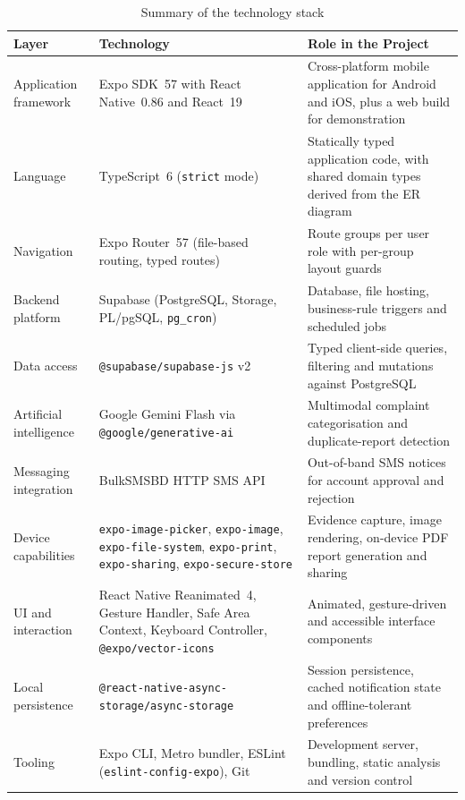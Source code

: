 \documentclass[11pt,a4paper]{article}
\newcommand{\code}[1]{\texttt{\small #1}}
\begin{document}
\begin{table}[!htbp]
\centering
\caption{Summary of the technology stack}
\label{tab:stack}
\renewcommand{\arraystretch}{1.25}
\begin{tabularx}{\textwidth}{L{3.3cm} L{4.1cm} X}
\toprule
\textbf{Layer} & \textbf{Technology} & \textbf{Role in the Project} \\
\midrule
Application framework & Expo SDK~57 with React Native~0.86 and React~19 &
Cross-platform mobile application for Android and iOS, plus a web build for
demonstration \\
\addlinespace
Language & TypeScript~6 (\code{strict} mode) &
Statically typed application code, with shared domain types derived from the ER
diagram \\
\addlinespace
Navigation & Expo Router~57 (file-based routing, typed routes) &
Route groups per user role with per-group layout guards \\
\addlinespace
Backend platform & Supabase (PostgreSQL, Storage, PL/pgSQL, \code{pg\_cron}) &
Database, file hosting, business-rule triggers and scheduled jobs \\
\addlinespace
Data access & \code{@supabase/supabase-js} v2 &
Typed client-side queries, filtering and mutations against PostgreSQL \\
\addlinespace
Artificial intelligence & Google Gemini Flash via \code{@google/generative-ai} &
Multimodal complaint categorisation and duplicate-report detection \\
\addlinespace
Messaging integration & BulkSMSBD HTTP SMS API &
Out-of-band SMS notices for account approval and rejection \\
\addlinespace
Device capabilities & \code{expo-image-picker}, \code{expo-image},
\code{expo-file-system}, \code{expo-print}, \code{expo-sharing},
\code{expo-secure-store} &
Evidence capture, image rendering, on-device PDF report generation and sharing \\
\addlinespace
UI and interaction & React Native Reanimated~4, Gesture Handler, Safe Area
Context, Keyboard Controller, \code{@expo/vector-icons} &
Animated, gesture-driven and accessible interface components \\
\addlinespace
Local persistence & \code{@react-native-async-storage/\allowbreak async-storage} &
Session persistence, cached notification state and offline-tolerant preferences \\
\addlinespace
Tooling & Expo CLI, Metro bundler, ESLint (\code{eslint-config-expo}), Git &
Development server, bundling, static analysis and version control \\
\bottomrule
\end{tabularx}
\end{table}
\end{document}
